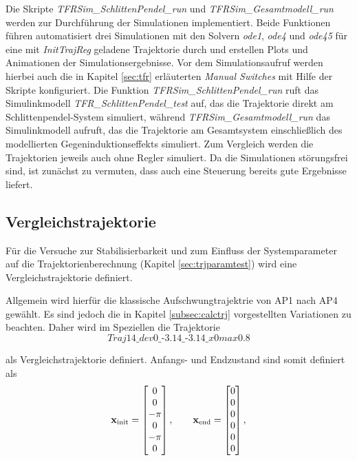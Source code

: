 Die Skripte \textit{TFRSim\_SchlittenPendel\_run} und \textit{TFRSim\_Gesamtmodell\_run} werden zur Durchführung der Simulationen implementiert. Beide Funktionen führen automatisiert drei Simulationen mit den Solvern \textit{ode1}, \textit{ode4} und \textit{ode45} für eine mit \textit{InitTrajReg} geladene Trajektorie durch und erstellen Plots und Animationen der Simulationsergebnisse. Vor dem Simulationsaufruf werden hierbei auch die in Kapitel \ref{sec:tfr} erläuterten \textit{Manual Switches} mit Hilfe der Skripte konfiguriert. Die Funktion \textit{TFRSim\_SchlittenPendel\_run} ruft das Simulinkmodell \textit{TFR\_SchlittenPendel\_test} auf, das die Trajektorie direkt am Schlittenpendel-System simuliert, während \textit{TFRSim\_Gesamtmodell\_run} das Simulinkmodell  aufruft, das die Trajektorie am Gesamtsystem einschließlich des modellierten Gegeninduktionseffekts simuliert. Zum Vergleich werden die Trajektorien jeweils auch ohne Regler simuliert. Da die Simulationen störungsfrei sind, ist zunächst zu vermuten, dass auch eine Steuerung bereits gute Ergebnisse liefert.

\subsection{Vergleichstrajektorie}\label{subsec:vglTrj}

Für die Versuche zur Stabilisierbarkeit und zum Einfluss der Systemparameter auf die Trajektorienberechnung (Kapitel \ref{sec:trjparamtest}) wird eine Vergleichstrajektorie definiert.

Allgemein wird hierfür die klassische Aufschwungtrajektrie von AP1 nach AP4 gewählt. Es sind jedoch die in Kapitel \ref{subsec:calctrj} vorgestellten Variationen zu beachten. Daher wird im Speziellen die Trajektorie
\[
	\textit{Traj14\_dev0\_-3.14\_-3.14\_x0max0.8}
\]

als Vergleichstrajektorie definiert. 
Anfangs- und Endzustand sind somit definiert als
\begin{align*}
	\boldsymbol{\mathrm{x}}_{\mathrm{init}} =
	\begin{bmatrix}
		0 \\ 0 \\ -\pi \\ 0 \\ -\pi \\ 0
	\end{bmatrix}	, \qquad
	\boldsymbol{\mathrm{x}}_{\mathrm{end}} =
	\begin{bmatrix}
		0 \\ 0 \\ 0 \\ 0 \\ 0 \\ 0
	\end{bmatrix} ,
\end{align*}


